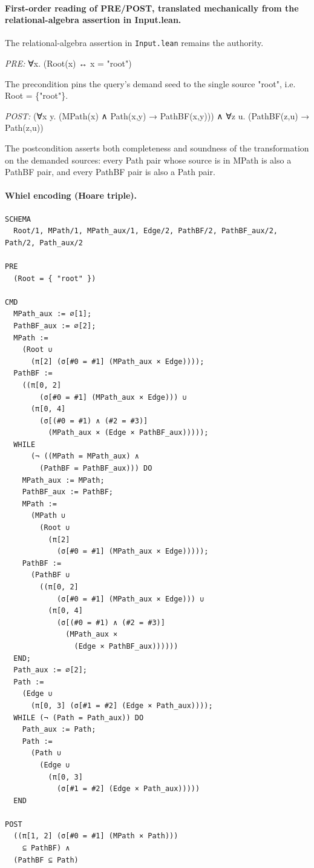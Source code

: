 \documentclass[10pt]{article}
\begin{document}
\paragraph{First-order reading of PRE/POST, translated mechanically from the relational-algebra assertion in Input.lean.} The relational-algebra assertion in \texttt{Input.lean} remains the authority.

\textit{PRE:} ∀x. (Root(x) ↔ x = "root")\par The precondition pins the query's demand seed to the single source "root", i.e. Root = \{"root"\}.

\textit{POST:} (∀x y. (MPath(x) ∧ Path(x,y) → PathBF(x,y))) ∧ ∀z u. (PathBF(z,u) → Path(z,u))\par The postcondition asserts both completeness and soundness of the transformation on the demanded sources: every Path pair whose source is in MPath is also a PathBF pair, and every PathBF pair is also a Path pair.

\paragraph{Whiel encoding (Hoare triple).}

\begin{Verbatim}[fontsize=\tiny,breaklines=true,breakanywhere=true,frame=single,framesep=1.5mm]
SCHEMA
  Root/1, MPath/1, MPath_aux/1, Edge/2, PathBF/2, PathBF_aux/2, Path/2, Path_aux/2

PRE
  (Root = { "root" }) 

CMD
  MPath_aux := ∅[1];
  PathBF_aux := ∅[2];
  MPath :=
    (Root ∪
      (π[2] (σ[#0 = #1] (MPath_aux × Edge))));
  PathBF :=
    ((π[0, 2]
        (σ[#0 = #1] (MPath_aux × Edge))) ∪
      (π[0, 4]
        (σ[(#0 = #1) ∧ (#2 = #3)]
          (MPath_aux × (Edge × PathBF_aux)))));
  WHILE
      (¬ ((MPath = MPath_aux) ∧
        (PathBF = PathBF_aux))) DO
    MPath_aux := MPath;
    PathBF_aux := PathBF;
    MPath :=
      (MPath ∪
        (Root ∪
          (π[2]
            (σ[#0 = #1] (MPath_aux × Edge)))));
    PathBF :=
      (PathBF ∪
        ((π[0, 2]
            (σ[#0 = #1] (MPath_aux × Edge))) ∪
          (π[0, 4]
            (σ[(#0 = #1) ∧ (#2 = #3)]
              (MPath_aux ×
                (Edge × PathBF_aux))))))
  END;
  Path_aux := ∅[2];
  Path :=
    (Edge ∪
      (π[0, 3] (σ[#1 = #2] (Edge × Path_aux))));
  WHILE (¬ (Path = Path_aux)) DO
    Path_aux := Path;
    Path :=
      (Path ∪
        (Edge ∪
          (π[0, 3]
            (σ[#1 = #2] (Edge × Path_aux)))))
  END

POST
  ((π[1, 2] (σ[#0 = #1] (MPath × Path)))
    ⊆ PathBF) ∧
  (PathBF ⊆ Path)
\end{Verbatim}
\end{document}
